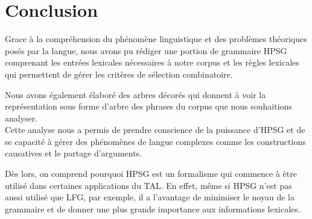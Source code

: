 \section{Conclusion}

Grace à la compréhension du phénomène linguistique et des problèmes théoriques posés par la langue, nous avons pu rédiger une portion de grammaire HPSG comprenant les entrées lexicales nécessaires à notre corpus et les règles lexicales qui permettent de gérer les critères de sélection combinatoire.

Nous avons également élaboré des arbres décorés qui donnent à voir la représentation sous forme d'arbre des phrases du corpus que nous souhaitions analyser.\\

Cette analyse nous a permis de prendre conscience de la puissance d'HPSG et de se capacité à gérer des phénomènes de langue
complexes comme les constructions causatives et le partage d'arguments.

Dès lors, on comprend pourquoi HPSG est un formalisme qui commence à être utilisé dans certaines applications du TAL.
En effet, même si HPSG n'est pas aussi utilisé que LFG, par exemple, il a l'avantage de minimiser le noyau de la grammaire et de donner une plus grande importance aux informations lexicales.
